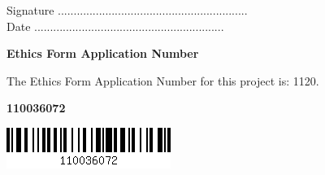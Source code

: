\vspace{2em}
Signature ............................................................  \\

\vspace{1em}
Date ............................................................ \\

\begin{center}
    {\LARGE\bf Ethics Form Application Number}
    
The Ethics Form Application Number for this project is: 1120. 
\end{center}

\vspace{5em}
\begin{center}
    {\LARGE\bf 110036072}

\includegraphics[scale=0.6]{Images/slj11-barcode.png}
\end{center}



